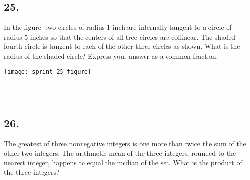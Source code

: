 \documentclass[12pt]{article}
\begin{document}
\subsection*{25.}
In the figure, two circles of radius $1$ inch are internally tangent to a circle of radius $5$ inches so that the centers of all tree circles are collinear. The shaded fourth circle is tangent to each of the other three circles as shown. What is the radius of the shaded circle? Express your answer as a common fraction. 

\begin{minipagex}[b]{\linewidth}
\centering
\texttt{[image: sprint-25-figure]}
\end{minipagex}

\nopagebreak

\begin{minipage}[b]{\linewidth}
\fbox{\phantom{ANSWER}}\\
\mbox{---------------}\\
\fbox{\phantom{ANSWER}}
\end{minipage}

\begin{answer}
%
\end{answer}


\subsection*{26.}
The greatest of three nonnegative integers is one more than twice the sum of the other two integers. The arithmetic mean of the three integers, rounded to the nearest integer, happens to equal the median of the set. What is the product of the three integers?

\nopagebreak

\fbox{\phantom{ANSWER}}

\begin{answer}
%
\end{answer}
\end{document}
